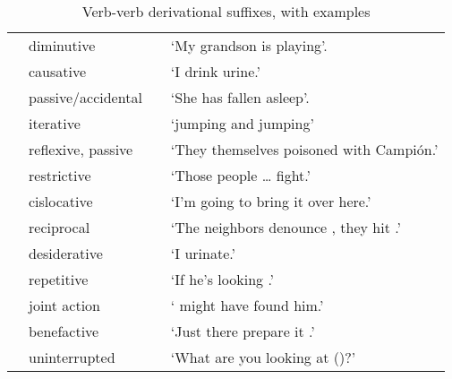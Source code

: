 \begin{table}[!ht]
\caption{Verb-verb derivational suffixes, with examples}\label{Tab27}
\begin{small}
\begin{center}
\begin{tabularx}{\textwidth}{l@{ }lL@{ }L}
\toprule
{}	& diminutive	&	&`My grandson is playing'.\\[0.5ex]
	&causative		&	&`I  drink urine.'\\[0.5ex]
		&passive/accidental &	&`She has fallen asleep'.\\[0.5ex]
	&iterative	&	&`jumping and jumping'\\[0.5ex]
		&reflexive, passive	&	&`They themselves poisoned with Campi\'on.'\\[0.5ex]
	&restrictive	&	&`Those people \dots{}  fight.'\\[0.5ex]
		&cislocative	&	&`I'm going to bring it over here.'\\[0.5ex]
	&reciprocal		&	&`The neighbors denounce , they hit .'\\[0.5ex]
	&desiderative	&	&`I  urinate.'\\[0.5ex]
		&repetitive			&	&`If he's looking .'\\[0.5ex]
&joint action		&	&` might have found him.'\\[0.5ex]
		&benefactive		&	&`Just there prepare it .'\\[0.5ex]
		&uninterrupted		&	&`What are you looking at ()?'\\[0.5ex]

\end{tabularx}
\end{center}
\end{small}
\end{table}
